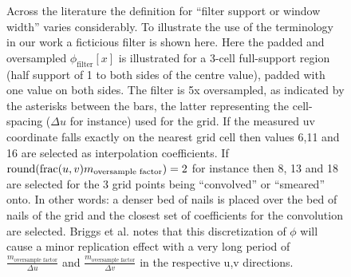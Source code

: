  \begin{figure}[h]
  \begin{mdframed}
   \centering
   \caption[Oversampled filter illustration]{Across the literature the definition for ``filter support or window width'' varies considerably. To illustrate the use of the
   terminology in our work a ficticious filter is shown here. Here the padded and oversampled $\phi_{\text{filter}}[x]$ is illustrated for a 3-cell full-support 
   region (half support of 1 to both sides of the centre value), padded with one value on both sides. The filter is 5x oversampled, as indicated by the asterisks
   between the bars, the latter representing the cell-spacing ($\Delta{u}$ for instance) used for the grid. If the measured uv coordinate falls exactly on the nearest grid 
   cell then values 6,11 and 16 are selected as interpolation coefficients. If $\textrm{round}{(\textrm{frac}{(u,v)}m_{\text{oversample factor}})} = 2$ for instance 
   then 8, 13 and 18 are selected for the 3 grid points being ``convolved'' or ``smeared'' onto. In other words: a denser bed of nails is placed over the bed of 
   nails of the grid and the closest set of coefficients for the convolution are selected. Briggs et al. \cite[Lecture 7]{taylor1999synthesis} notes that this discretization
   of $\phi$ will cause a minor replication effect with a very long period of $\frac{m_{\text{oversample factor}}}{\Delta{u}}$ and 
   $\frac{m_{\text{oversample factor}}}{\Delta{v}}$ in the respective u,v directions.}
   \label{fig_filter}
  \end{mdframed}
 \end{figure}
